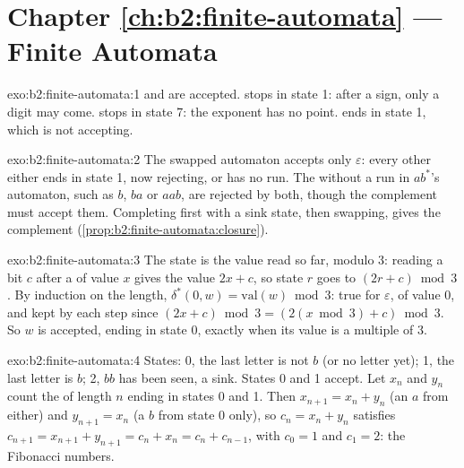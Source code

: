 \section*{Chapter \ref{ch:b2:finite-automata} --- Finite Automata}

\begin{solution}{exo:b2:finite-automata:1}
 and  are accepted.  stops in state 1: after a sign, only a digit may come.
 stops in state 7: the exponent has no point. \code{+} ends in state 1, which is not accepting.
\end{solution}

\begin{solution}{exo:b2:finite-automata:2}
The swapped automaton accepts only $\varepsilon$: every other  either ends in state 1, now rejecting, or has no
run. The  without a run in $ab^*$'s automaton, such as $b$, $ba$ or $aab$, are rejected by both, though the
complement must accept them. Completing first with a sink state, then swapping, gives the complement
(\cref{prop:b2:finite-automata:closure}).
\end{solution}

\begin{solution}{exo:b2:finite-automata:3}
The state is the value read so far, modulo 3: reading a bit $c$ after a  of value $x$ gives the value $2x + c$,
so state $r$ goes to $(2r + c) \bmod 3$. By induction on the length, $\delta^*(0, w) = \mathrm{val}(w) \bmod 3$: true
for $\varepsilon$, of value 0, and kept by each step since $(2x + c) \bmod 3 = (2(x \bmod 3) + c) \bmod 3$. So $w$ is
accepted, ending in state 0, exactly when its value is a multiple of 3.
\end{solution}

\begin{solution}{exo:b2:finite-automata:4}
States: 0, the last letter is not $b$ (or no letter yet); 1, the last letter is $b$; 2, $bb$ has been seen, a sink.
States 0 and 1 accept. Let $x_n$ and $y_n$ count the  of length $n$ ending in states 0 and 1. Then $x_{n+1} =
x_n + y_n$ (an $a$ from either) and $y_{n+1} = x_n$ (a $b$ from state 0 only), so $c_n = x_n + y_n$ satisfies $c_{n+1}
= x_{n+1} + y_{n+1} = c_n + x_n = c_n + c_{n-1}$, with $c_0 = 1$ and $c_1 = 2$: the Fibonacci numbers.
\end{solution}

